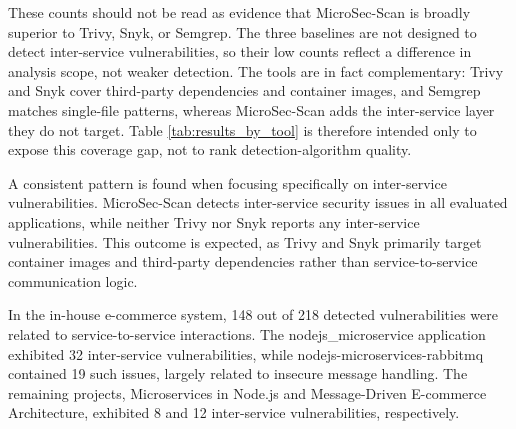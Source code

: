 \documentclass[preprint,12pt]{elsarticle}
\newcommand{\new}[1]{#1}
\begin{document}
\new{These counts should not be read as evidence that MicroSec-Scan is broadly superior to Trivy, Snyk, or Semgrep. The three baselines are not designed to detect inter-service vulnerabilities, so their low counts reflect a difference in analysis scope, not weaker detection. The tools are in fact complementary: Trivy and Snyk cover third-party dependencies and container images, and Semgrep matches single-file patterns, whereas MicroSec-Scan adds the inter-service layer they do not target. Table \ref{tab:results_by_tool} is therefore intended only to expose this coverage gap, not to rank detection-algorithm quality.}


A consistent pattern is found when focusing specifically on inter-service vulnerabilities. MicroSec-Scan detects inter-service security issues in all evaluated applications, while neither Trivy nor Snyk reports any inter-service vulnerabilities. This outcome is expected, as Trivy and Snyk primarily target container images and third-party dependencies rather than service-to-service communication logic.

In the in-house e-commerce system, 148 out of 218 detected vulnerabilities were related to service-to-service interactions. The nodejs\_microservice application exhibited 32 inter-service vulnerabilities, while nodejs-microservices-rabbitmq contained 19 such issues, largely related to insecure message handling. The remaining projects, Microservices in Node.js and Message-Driven E-commerce Architecture, exhibited 8 and 12 inter-service vulnerabilities, respectively.
\end{document}
